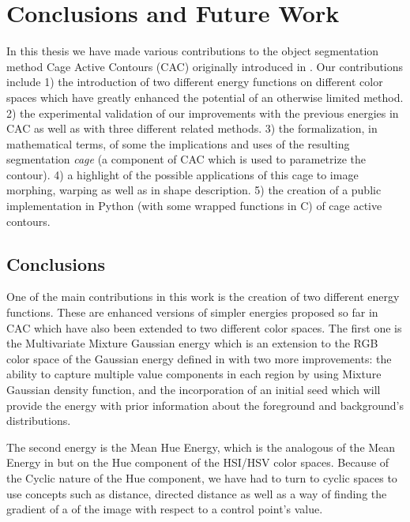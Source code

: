 \newpage

\chapter{Conclusions and Future Work}
\label{sec:conclusions}

\noindent

In this thesis we have made various contributions to the object segmentation method Cage Active Contours (CAC) originally introduced in \cite{ipcac2015}. Our contributions include 1) the introduction of two different energy functions on different color spaces which have greatly enhanced the potential of an otherwise limited method. 2) the experimental validation of our improvements with the previous energies in CAC as well as with three different related methods.  3) the formalization, in mathematical terms, of some the implications and uses of the resulting segmentation \textit{cage} (a component of CAC which is used to parametrize the contour). 4)  a highlight of the possible applications of this cage to image morphing, warping as well as in shape description. 5) the creation of a public implementation in Python (with some wrapped functions in C) of cage active contours.

\section{Conclusions}

 One of the main contributions in this work is the creation of two different energy functions. These are enhanced versions of simpler energies proposed so far in CAC which have also been extended to two different color spaces. The first one is the Multivariate Mixture Gaussian energy which is an extension to the RGB color space of the Gaussian energy defined in \cite{ipcac2015} with two more improvements: the ability to capture multiple value components in each region by using Mixture Gaussian density function, and the incorporation of an initial seed which will provide the energy with prior information about the foreground and background's distributions.

The second energy is the Mean Hue Energy, which is the analogous of the Mean Energy in \cite{ipcac2015} but on the Hue component of the HSI/HSV color spaces. Because of the Cyclic nature of the Hue component, we have had to turn to cyclic spaces to use concepts such as distance, directed distance as well as a way of finding the gradient of a of the image with respect to a control point's value.

